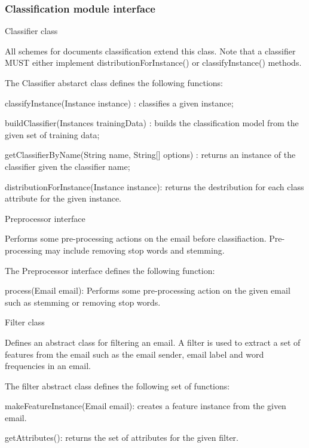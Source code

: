 \subsubsection{Classification module interface}
\begin{my_itemize}
  \item Classifier class
  \begin{my_desc}
   \item[Purpose] All schemes for documents classification extend this class. Note that a classifier MUST either implement distributionForInstance() or classifyInstance() methods.
   \item[Function] The Classifier abstarct class defines the following functions:
	\begin{my_itemize}
		\item classifyInstance(Instance instance) : classifies a given instance;
		\item buildClassifier(Instances trainingData) : builds the classification model from the given set of training data;
		\item getClassifierByName(String name, String[] options) : returns an instance of the classifier given the classifier name;
		\item distributionForInstance(Instance instance): returns the destribution for each class attribute for the given instance.
	\end{my_itemize}
  \end{my_desc}

  \item Preprocessor interface
  \begin{my_desc}
   \item[Purpose] Performs some pre-processing actions on the email before classifiaction. Pre-processing may include removing stop words and stemming. 
   \item[Function] The Preprocessor interface defines the following function:
	\begin{my_itemize}
	\item process(Email email): Performs some pre-processing action on the given email such as stemming or removing stop words.
	\end{my_itemize}
  \end{my_desc}

  \item Filter class
  \begin{my_desc}
   \item[Purpose] Defines an abstract class for filtering an email. A filter is used to extract a set of features from the email such as the email sender, email label and word frequencies in an email.
   \item[Function] The filter abstract class defines the following set of functions:
	\begin{my_itemize}
	\item makeFeatureInstance(Email email): creates a feature instance from the given email.
	\item getAttributes(): returns the set of attributes for the given filter.
	\end{my_itemize}
  \end{my_desc}


\end{my_itemize}

